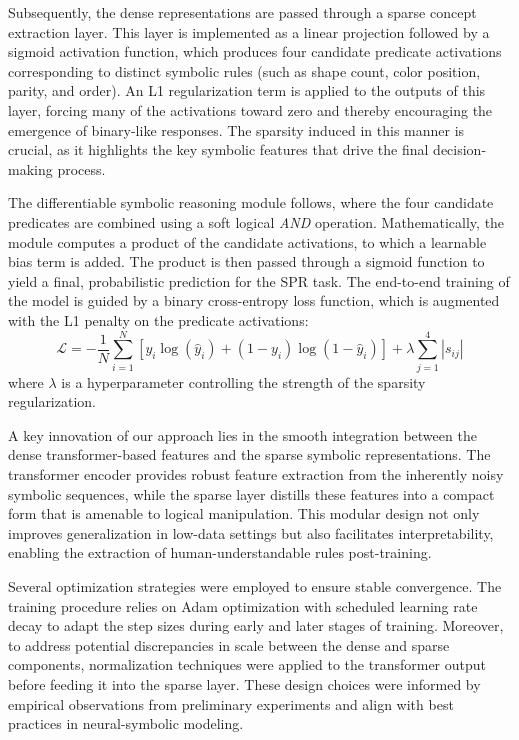 \documentclass{article}
\begin{document}
Subsequently, the dense representations are passed through a sparse concept extraction layer. This layer is implemented as a linear projection followed by a sigmoid activation function, which produces four candidate predicate activations corresponding to distinct symbolic rules (such as shape count, color position, parity, and order). An L1 regularization term is applied to the outputs of this layer, forcing many of the activations toward zero and thereby encouraging the emergence of binary-like responses. The sparsity induced in this manner is crucial, as it highlights the key symbolic features that drive the final decision-making process.

The differentiable symbolic reasoning module follows, where the four candidate predicates are combined using a soft logical \emph{AND} operation. Mathematically, the module computes a product of the candidate activations, to which a learnable bias term is added. The product is then passed through a sigmoid function to yield a final, probabilistic prediction for the SPR task. The end-to-end training of the model is guided by a binary cross-entropy loss function, which is augmented with the L1 penalty on the predicate activations:
\[
\mathcal{L} = -\frac{1}{N}\sum_{i=1}^{N}\left[y_i \log(\hat{y}_i) + (1-y_i)\log(1-\hat{y}_i)\right] + \lambda \sum_{j=1}^{4} |s_{ij}|
\]
where \( \lambda \) is a hyperparameter controlling the strength of the sparsity regularization.

A key innovation of our approach lies in the smooth integration between the dense transformer-based features and the sparse symbolic representations. The transformer encoder provides robust feature extraction from the inherently noisy symbolic sequences, while the sparse layer distills these features into a compact form that is amenable to logical manipulation. This modular design not only improves generalization in low-data settings but also facilitates interpretability, enabling the extraction of human-understandable rules post-training.

Several optimization strategies were employed to ensure stable convergence. The training procedure relies on Adam optimization with scheduled learning rate decay to adapt the step sizes during early and later stages of training. Moreover, to address potential discrepancies in scale between the dense and sparse components, normalization techniques were applied to the transformer output before feeding it into the sparse layer. These design choices were informed by empirical observations from preliminary experiments and align with best practices in neural-symbolic modeling.
\end{document}
